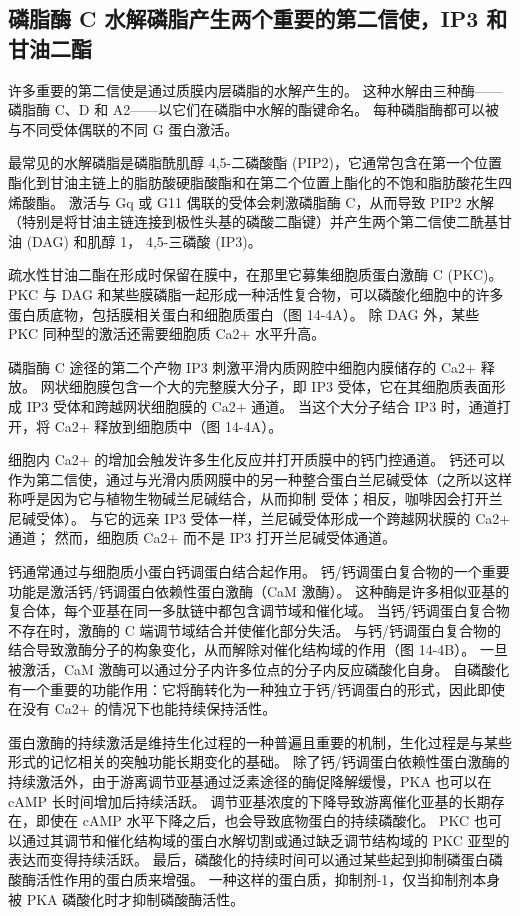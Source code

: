 \subsection{磷脂酶 C 水解磷脂产生两个重要的第二信使，IP3 和甘油二酯}

许多重要的第二信使是通过质膜内层磷脂的水解产生的。 
这种水解由三种酶——磷脂酶 C、D 和 A2——以它们在磷脂中水解的酯键命名。 
每种磷脂酶都可以被与不同受体偶联的不同 G 蛋白激活。


最常见的水解磷脂是磷脂酰肌醇 4,5-二磷酸酯 (PIP2)，它通常包含在第一个位置酯化到甘油主链上的脂肪酸硬脂酸酯和在第二个位置上酯化的不饱和脂肪酸花生四烯酸酯。
激活与 Gq 或 G11 偶联的受体会刺激磷脂酶 C，从而导致 PIP2 水解（特别是将甘油主链连接到极性头基的磷酸二酯键）并产生两个第二信使二酰基甘油 (DAG) 和肌醇 1， 4,5-三磷酸 (IP3)。


疏水性甘油二酯在形成时保留在膜中，在那里它募集细胞质蛋白激酶 C (PKC)。
PKC 与 DAG 和某些膜磷脂一起形成一种活性复合物，可以磷酸化细胞中的许多蛋白质底物，包括膜相关蛋白和细胞质蛋白（图 14-4A）。
除 DAG 外，某些 PKC 同种型的激活还需要细胞质 Ca2+ 水平升高。


磷脂酶 C 途径的第二个产物 IP3 刺激平滑内质网腔中细胞内膜储存的 Ca2+ 释放。
网状细胞膜包含一个大的完整膜大分子，即 IP3 受体，它在其细胞质表面形成 IP3 受体和跨越网状细胞膜的 Ca2+ 通道。
当这个大分子结合 IP3 时，通道打开，将 Ca2+ 释放到细胞质中（图 14-4A）。


细胞内 Ca2+ 的增加会触发许多生化反应并打开质膜中的钙门控通道。
钙还可以作为第二信使，通过与光滑内质网膜中的另一种整合蛋白兰尼碱受体（之所以这样称呼是因为它与植物生物碱兰尼碱结合，从而抑制 受体；相反，咖啡因会打开兰尼碱受体）。
与它的远亲 IP3 受体一样，兰尼碱受体形成一个跨越网状膜的 Ca2+ 通道； 
然而，细胞质 Ca2+ 而不是 IP3 打开兰尼碱受体通道。


钙通常通过与细胞质小蛋白钙调蛋白结合起作用。
钙/钙调蛋白复合物的一个重要功能是激活钙/钙调蛋白依赖性蛋白激酶（CaM 激酶）。
这种酶是许多相似亚基的复合体，每个亚基在同一多肽链中都包含调节域和催化域。
当钙/钙调蛋白复合物不存在时，激酶的 C 端调节域结合并使催化部分失活。
与钙/钙调蛋白复合物的结合导致激酶分子的构象变化，从而解除对催化结构域的作用（图 14-4B）。
一旦被激活，CaM 激酶可以通过分子内许多位点的分子内反应磷酸化自身。
自磷酸化有一个重要的功能作用：它将酶转化为一种独立于钙/钙调蛋白的形式，因此即使在没有 Ca2+ 的情况下也能持续保持活性。


蛋白激酶的持续激活是维持生化过程的一种普遍且重要的机制，生化过程是与某些形式的记忆相关的突触功能长期变化的基础。
除了钙/钙调蛋白依赖性蛋白激酶的持续激活外，由于游离调节亚基通过泛素途径的酶促降解缓慢，PKA 也可以在 cAMP 长时间增加后持续活跃。
调节亚基浓度的下降导致游离催化亚基的长期存在，即使在 cAMP 水平下降之后，也会导致底物蛋白的持续磷酸化。
PKC 也可以通过其调节和催化结构域的蛋白水解切割或通过缺乏调节结构域的 PKC 亚型的表达而变得持续活跃。
最后，磷酸化的持续时间可以通过某些起到抑制磷蛋白磷酸酶活性作用的蛋白质来增强。
一种这样的蛋白质，抑制剂-1，仅当抑制剂本身被 PKA 磷酸化时才抑制磷酸酶活性。


